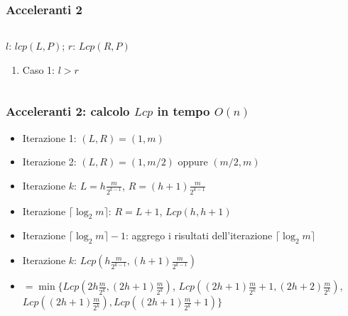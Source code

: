 \begin{frame}[fragile]
\frametitle{Acceleranti 2}
\begin{columns}[T]
\begin{column}[T]{0.6\textwidth}
\begin{block}{$l$: $lcp(L,P)$; $r$: $Lcp(R,P)$}
\begin{enumerate}
\item
Caso 1: $l>r$
\end{enumerate}
\end{block}
\end{column}
\begin{column}{0.38\textwidth}
\end{column}
\end{columns}
\end{frame}

\begin{frame}[fragile]
\frametitle{Acceleranti 2: calcolo $Lcp$ in tempo $O(n)$}
\begin{itemize}[<+->]
\item
Iterazione 1: $(L,R)=(1,m)$
\item
Iterazione 2: $(L,R)=(1,m/2)$ oppure $(m/2,m)$
\item
Iterazione $k$: $L = h\frac{m}{2^{k-1}}$, $R = (h+1)\frac{m}{2^{k-1}}$
\item
Iterazione $\lceil \log_{2}m\rceil$: $R=L+1$, $Lcp(h,h+1)$
\item
Iterazione $\lceil \log_{2}m\rceil -1$: aggrego i risultati dell'iterazione
$\lceil \log_{2}m\rceil$
\item
Iterazione $k$: $Lcp(h\frac{m}{2^{k-1}}, (h+1)\frac{m}{2^{k-1}})$
\item
$=\min\{Lcp(2h\frac{m}{2^{k}}, (2h+1)\frac{m}{2^{k}})$,
$Lcp((2h+1)\frac{m}{2^{k}}+1, (2h+2)\frac{m}{2^{k}})$,
$Lcp((2h+1)\frac{m}{2^{k}}), Lcp((2h+1)\frac{m}{2^{k}}+1)\}$
\end{itemize}
\end{frame}


